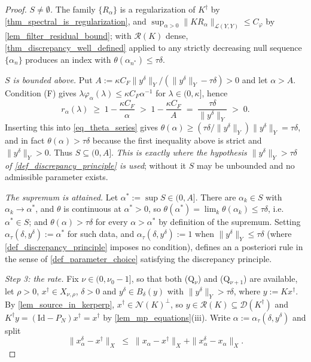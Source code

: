 \documentclass[a4paper]{report}
\theoremstyle{plain}
\theoremstyle{definition}
\theoremstyle{remark}
\newcommand{\Ll}{\mathcal{L}}
\newcommand{\Ran}{\mathcal{R}}
\newcommand{\Ker}{\mathcal{N}}
\newcommand{\Dom}{\mathcal{D}}
\newcommand{\Id}{\mathrm{Id}}
\newcommand{\dg}{^{\dagger}}
\begin{document}
\begin{proof}
  \emph{$S \ne \emptyset$.}  The family $\{R_{\alpha}\}$ is a regularization of $K\dg$
  by \cref{thm_spectral_is_regularization}, and
  $\sup_{\alpha>0}\|KR_{\alpha}\|_{\Ll(Y,Y)} \le C_{\varphi}$
  by \cref{lem_filter_residual_bound}; with $\Ran(K)$ dense,
  \cref{thm_discrepancy_well_defined} applied to any strictly decreasing null sequence
  $\{\alpha_n\}$ produces an index with $\theta(\alpha_{n^{*}}) \le \tau\delta$.

  \emph{$S$ is bounded above.}  Put $A := \kappa C_F\|y^{\delta}\|_Y/(\|y^{\delta}\|_Y -
  \tau\delta) > 0$ and let $\alpha > A$.  Condition (F) gives $\lambda\varphi_{\alpha}
  (\lambda) \le \kappa C_F\alpha^{-1}$ for $\lambda \in (0,\kappa]$, hence
  \[
    r_{\alpha}(\lambda) \;\ge\; 1 - \frac{\kappa C_F}{\alpha} \;>\;
      1 - \frac{\kappa C_F}{A} \;=\; \frac{\tau\delta}{\|y^{\delta}\|_Y} \;>\; 0 .
  \]
  Inserting this into \eqref{eq_theta_series} gives $\theta(\alpha) \ge
  (\tau\delta/\|y^{\delta}\|_Y)\|y^{\delta}\|_Y = \tau\delta$, and in fact
  $\theta(\alpha) > \tau\delta$ because the first inequality above is strict and
  $\|y^{\delta}\|_Y > 0$.  Thus $S \subseteq (0,A]$.  \emph{This is exactly where the
  hypothesis $\|y^{\delta}\|_Y > \tau\delta$ of \cref{def_discrepancy_principle} is
  used}; without it $S$ may be unbounded and no admissible parameter exists.

  \emph{The supremum is attained.}  Let $\alpha^{*} := \sup S \in (0,A]$.  There are
  $\alpha_k \in S$ with $\alpha_k \to \alpha^{*}$, and $\theta$ is continuous at
  $\alpha^{*} > 0$, so $\theta(\alpha^{*}) = \lim_k \theta(\alpha_k) \le \tau\delta$,
  i.e.\ $\alpha^{*} \in S$; and $\theta(\alpha) > \tau\delta$ for every $\alpha >
  \alpha^{*}$ by definition of the supremum.  Setting $\alpha_{\tau}(\delta,y^{\delta})
  := \alpha^{*}$ for such data, and $\alpha_{\tau}(\delta,y^{\delta}) := 1$ when
  $\|y^{\delta}\|_Y \le \tau\delta$ (where \cref{def_discrepancy_principle} imposes no
  condition), defines an a posteriori rule in the sense of
  \cref{def_parameter_choice} satisfying the discrepancy principle.

  \emph{Step 3: the rate.}  Fix $\nu \in (0,\nu_0-1]$, so that both (Q$_{\nu}$) and
  (Q$_{\nu+1}$) are available, let $\rho > 0$, $x\dg \in X_{\nu,\rho}$, $\delta > 0$ and
  $y^{\delta} \in B_{\delta}(y)$ with $\|y^{\delta}\|_Y > \tau\delta$, where $y :=
  Kx\dg$.  By \cref{lem_source_in_kerperp}, $x\dg \in \Ker(K)^{\perp}$, so $y \in
  \Ran(K) \subseteq \Dom(K\dg)$ and $K\dg y = (\Id - P_N)x\dg = x\dg$ by
  \cref{lem_mp_equations}(iii).  Write $\alpha := \alpha_{\tau}(\delta,y^{\delta})$ and
  split
  \[
    \|x^{\delta}_{\alpha} - x\dg\|_X \;\le\;
      \|x_{\alpha} - x\dg\|_X + \|x^{\delta}_{\alpha} - x_{\alpha}\|_X .
  \]


\end{proof}
\end{document}
